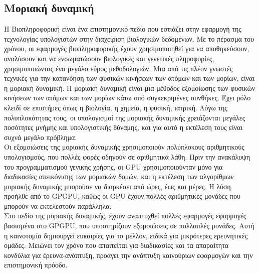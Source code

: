 \subsection{Μοριακή δυναμική}
Η Βιοπληροφορική είναι ένα επιστημονικό πεδίο που εστιάζει στην εφαρμογή της τεχνολογίας υπολογιστών στην διαχείριση βιολογικών δεδομένων. Με το πέρασμα του χρόνου, οι εφαρμογές βιοπληροφορικής έχουν χρησιμοποιηθεί για να αποθηκεύσουν, αναλύσουν και να ενσωματώσουν βιολογικές και γενετικές πληροφορίες, χρησιμοποιώντας ένα μεγάλο εύρος μεθοδολογιών. Μια από τις πλέον γνωστές τεχνικές για την κατανόηση των φυσικών κινήσεων των ατόμων και των μορίων, είναι η μοριακή δυναμική. Η μοριακή δυναμική είναι μια μέθοδος εξομοίωσης των φυσικών κινήσεων των ατόμων και των μορίων κάτω από συγκεκριμένες συνθήκες. Έχει ρόλο κλειδί σε επιστήμες όπως η βιολογία, η χημεία, η φυσική, ιατρική. Λόγω της πολυπλοκότητας τους, οι υπολογισμοί της μοριακής δυναμικής χρειάζονται μεγάλες ποσότητες μνήμης και υπολογιστικής δύναμης, και για αυτό η εκτέλεση τους είναι συχνά μεγάλο πρόβλημα.\cite{bioinformatics-3} \\
Οι εξομοιώσεις της μοριακής δυναμικής χρησιμοποιούν πολύπλοκους αριθμητικούς υπολογισμούς, που πολλές φορές οδηγούν σε αριθμητικά λάθη. Πριν την ανακάλυψη του προγραμματισμού γενικής χρήσης, οι GPU χρησιμοποιούνταν μόνο για διαδικασίες απεικόνισης των μοριακών δομών, και η εκτέλεση των αλγορίθμων μοριακής δυναμικής μπορούσε να διαρκέσει από ώρες, έως και μέρες. Η λύση προήλθε από το GPGPU, καθώς οι GPU έχουν πολλές αριθμητικές μονάδες που μπορούν να εκτελεστούν παράλληλα. \\
Στο πεδίο της μοριακής δυναμικής, έχουν αναπτυχθεί πολλές εφαρμογές εφαρμογές βασισμένα στο GPGPU, που υποστηρίζουν εξομοιώσεις σε πολλαπλές μονάδες. Αυτή η καινοτομία δημιουργεί ευκαιρίες για το μέλλον, ειδικά για μικρότερες ερευνητικές ομάδες. Μειώνει τον χρόνο που απαιτείται για διαδικασίες και τα απαραίτητα κονδύλια για έρευνα-ανάπτυξη, προάγει την ανάπτυξη καινούριων εφαρμογών και την επιστημονική πρόοδο.\cite{bioinformatics-4}
